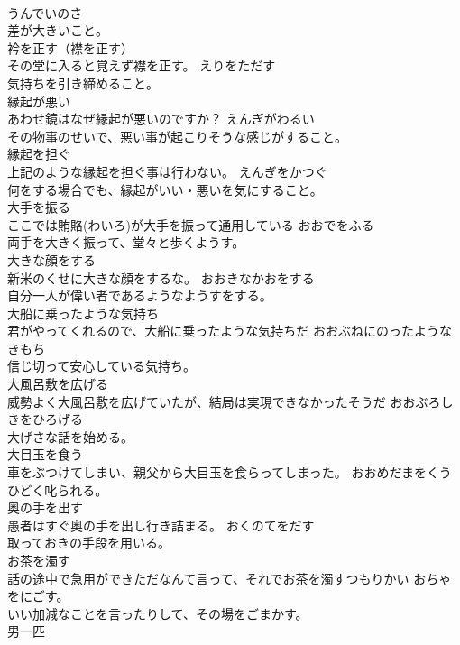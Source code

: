 \documentclass[8pt]{extreport}
\begin{document}
\begin{CJK}{UTF8}{min}
\\	うんでいのさ	
\\	差が大きいこと。
\\	衿を正す（襟を正す）	
\\	その堂に入ると覚えず襟を正す。	えりをただす	
\\	気持ちを引き締めること。
\\	縁起が悪い	
\\	あわせ鏡はなぜ縁起が悪いのですか？	えんぎがわるい		
\\	その物事のせいで、悪い事が起こりそうな感じがすること。
\\	縁起を担ぐ	
\\	上記のような縁起を担ぐ事は行わない。	えんぎをかつぐ		
\\	何をする場合でも、縁起がいい・悪いを気にすること。
\\	大手を振る	
\\	ここでは賄賂(わいろ)が大手を振って通用している	おおでをふる	
\\	両手を大きく振って、堂々と歩くようす。
\\	大きな顔をする	
\\	新米のくせに大きな顔をするな。	おおきなかおをする	
\\	自分一人が偉い者であるようなようすをする。
\\	大船に乗ったような気持ち	
\\	君がやってくれるので、大船に乗ったような気持ちだ	おおぶねにのったようなきもち	
\\	信じ切って安心している気持ち。
\\	大風呂敷を広げる	
\\	威勢よく大風呂敷を広げていたが、結局は実現できなかったそうだ	おおぶろしきをひろげる	
\\	大げさな話を始める。
\\	大目玉を食う	
\\	車をぶつけてしまい、親父から大目玉を食らってしまった。	おおめだまをくう	
\\	ひどく叱られる。
\\	奥の手を出す	
\\	愚者はすぐ奥の手を出し行き詰まる。	おくのてをだす	
\\	取っておきの手段を用いる。
\\	お茶を濁す	
\\	話の途中で急用ができただなんて言って、それでお茶を濁すつもりかい	おちゃをにごす。	
\\	いい加減なことを言ったりして、その場をごまかす。
\\	男一匹	

\end{CJK}
\end{document}
